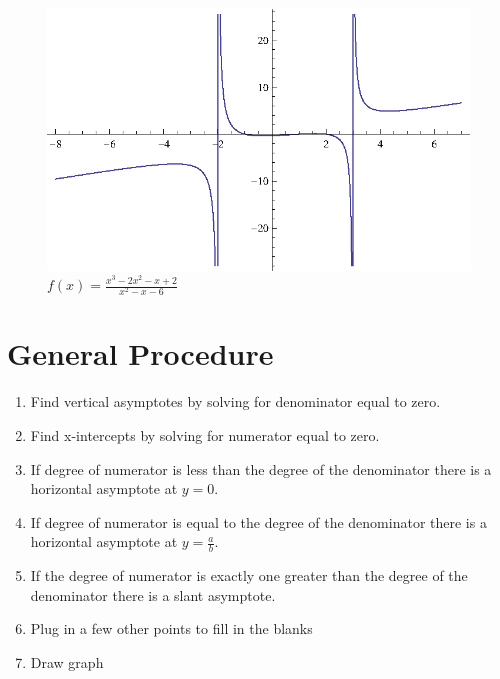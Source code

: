 \documentclass{exam}
\begin{document}
  \begin{figure}[H]
    \centering
    \includegraphics[scale=1.0]{figure7.eps}
    \caption*{$f(x) = \frac{x^3-2 x^2-x+2}{x^2-x-6}$}
  \end{figure}

  \section{General Procedure}

  \begin{enumerate}
    \item Find vertical asymptotes by solving for denominator equal to zero.

    \item Find x-intercepts by solving for numerator equal to zero.

    \item If degree of numerator is less than the degree of the denominator there is a horizontal asymptote at
      $y = 0$.

    \item If degree of numerator is equal to the degree of the denominator there is a horizontal asymptote at 
      $y = \frac{a}{b}$.

    \item If the degree of numerator is exactly one greater than the degree of the denominator there is a slant
      asymptote.

    \item Plug in a few other points to fill in the blanks

    \item Draw graph

  \end{enumerate}
\end{document}
